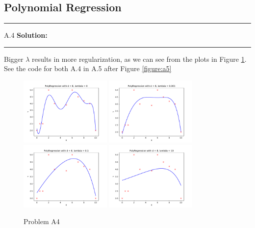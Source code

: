 \documentclass{article}
\newcommand{\1}{\mathbf{1}}
\begin{document}
\subsection*{Polynomial Regression}

\noindent\rule{\textwidth}{1pt}
A.4 {\bf Solution:}\\
\noindent\rule{\textwidth}{1pt}
Bigger $\lambda$ results in more regularization, as we can see from the plots in Figure \ref{figure:a4}. See the code for both A.4 in A.5 after Figure \ref{figure:a5}
    \begin{figure}[h!]
            \centering
            \includegraphics[width=0.4\textwidth]{hw1/code/Polynomial_Regression/figures/A4_l0.pdf}
            \includegraphics[width=0.4\textwidth]{hw1/code/Polynomial_Regression/figures/A4_l0001.pdf}
            \includegraphics[width=0.4\textwidth]{hw1/code/Polynomial_Regression/figures/A4_l01.pdf}
            \includegraphics[width=0.4\textwidth]{hw1/code/Polynomial_Regression/figures/A4_l10.pdf}
            \caption{Problem A4}
            \label{figure:a4}
    \end{figure}
\end{document}
